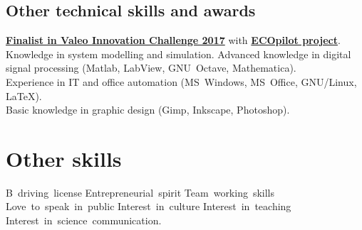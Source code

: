 \documentclass[11pt,a4paper,sans,spanish]{moderncv}
\begin{document}
\subsection{Other technical skills and awards}
\textbf{\href{https://valeoinnovationchallenge.valeo.com/news/interviews/introducing-team-ecopilot}{Finalist in Valeo Innovation Challenge 2017}} with \textbf{\href{http://myecopilot.com}{ECOpilot project}}.
\protect\\[0.4em]
Knowledge in system modelling and simulation. Advanced knowledge in digital signal processing (Matlab, LabView, GNU~Octave, Mathematica).
\protect\\[0.4em]
Experience in IT and office automation (MS~Windows, MS~Office, GNU/Linux, LaTeX).
\protect\\[0.4em]
Basic knowledge in graphic design (Gimp, Inkscape, Photoshop).


\section{Other skills}
\begin{center}
B~driving~license \quad{} Entrepreneurial~spirit \quad{} Team~working~skills \quad{} Love~to~speak~in~public \quad{} Interest~in~culture \quad{} Interest~in~teaching \quad{} Interest~in~science~communication.
\end{center}
\end{document}
